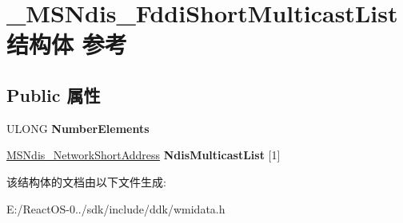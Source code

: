 \hypertarget{struct___m_s_ndis___fddi_short_multicast_list}{}\section{\+\_\+\+M\+S\+Ndis\+\_\+\+Fddi\+Short\+Multicast\+List结构体 参考}
\label{struct___m_s_ndis___fddi_short_multicast_list}
\subsection*{Public 属性}
\begin{DoxyCompactItemize}
\item 
\mbox{\label{struct___m_s_ndis___fddi_short_multicast_list_a89cc9a3f7d27de8ced79f3bf2171b7e3}} 
U\+L\+O\+NG {\bfseries Number\+Elements}
\item 
\mbox{\label{struct___m_s_ndis___fddi_short_multicast_list_a39b89d1e5ae9a9f3661bebc1fbd1d19b}} 
\hyperlink{struct___m_s_ndis___network_short_address}{M\+S\+Ndis\+\_\+\+Network\+Short\+Address} {\bfseries Ndis\+Multicast\+List} \mbox{[}1\mbox{]}
\end{DoxyCompactItemize}


该结构体的文档由以下文件生成\+:\begin{DoxyCompactItemize}
\item 
E\+:/\+React\+O\+S-\/0../sdk/include/ddk/wmidata.\+h\end{DoxyCompactItemize}
